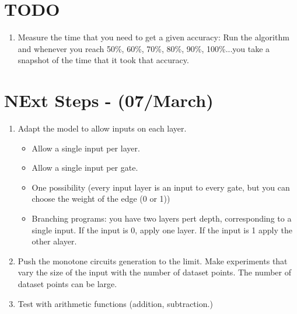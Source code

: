 

\section{TODO}

\begin{enumerate}
    \item Measure the time that you need to get a given accuracy: Run the algorithm and whenever you reach 50\%, 60\%, 70\%, 80\%, 90\%, 100\%...you take a snapshot of the time that it took that accuracy. 
\end{enumerate}


\section{NExt Steps - (07/March)}

\begin{enumerate}
    \item Adapt the model to allow inputs on each layer. 
    \begin{itemize}
        \item Allow a single input per layer.
        \item Allow a single input per gate.
        \item One possibility (every input layer is an input to every gate, but you can choose the weight of the edge (0 or 1)) 
        \item Branching programs: you have two layers pert depth, corresponding to a single input. If the input is 0, apply one layer. If the input is 1 apply the other alayer. 
    \end{itemize}
    \item Push the monotone circuits generation to the limit. Make experiments that vary the size of the input with the number of dataset points. 
    The number of dataset points can be large. 
    \item Test with arithmetic functions (addition, subtraction.)
\end{enumerate}

